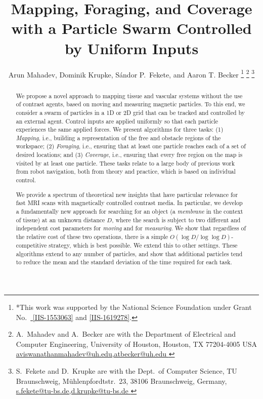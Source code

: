 \documentclass[letterpaper, 10 pt, conference]{ieeeconf}
\title{\LARGE \bf Mapping, Foraging, and Coverage\\ with a Particle Swarm Controlled by Uniform Inputs}
\author{Arun Mahadev, Dominik Krupke, S\'{a}ndor P.~Fekete, and Aaron T. Becker%
\thanks{*This work was supported by the National Science Foundation under Grant No.\ \href{http://nsf.gov/awardsearch/showAward?AWD_ID=1553063}{ [IIS-1553063]} and \href{http://nsf.gov/awardsearch/showAward?AWD_ID=1619278}{[IIS-1619278]}.}%
\thanks{A.~Mahadev and A.~Becker are with the Department of Electrical and Computer Engineering,  University of Houston, Houston, TX 77204-4005 USA 
      \protect\url{ aviswanathanmahadev@uh.edu,atbecker@uh.edu }}
\thanks{S.~Fekete and D.~Krupke are with the Dept.~of Computer Science, TU Braunschweig,  M\"uhlenpfordtstr.~23, 38106 Braunschweig, Germany,
      \protect\url{s.fekete@tu-bs.de,d.krupke@tu-bs.de  }
} %
}
\begin{document}
\maketitle
\thispagestyle{empty}
\pagestyle{empty}


\begin{abstract}
We propose a novel approach to mapping tissue and vascular systems without the use of contrast agents,
based on moving and measuring magnetic particles.
To this end, we consider a swarm of particles in a 1D or 2D grid that can be tracked and controlled by an external agent. 
Control inputs are applied uniformly so that each particle experiences the same applied forces. 
We present algorithms for three tasks: (1) {\em Mapping}, i.e., building a representation of the free and obstacle regions of the workspace;
(2) {\em Foraging}, i.e., ensuring that at least one particle reaches each of a set of desired locations; 
and (3) {\em Coverage}, i.e., ensuring that every free region on the map is visited by at least one particle.
These tasks relate to a large body of previous work from robot navigation, both from theory and practice, 
which is based on individual control.

We provide a spectrum of theoretical new insights 
that have particular relevance for fast MRI scans with magnetically controlled contrast media.
In particular, we develop a fundamentally new approach 
for searching for an object (a {\em membrane} in the context of tissue) at an unknown distance $D$, where the search is 
subject to two different and independent cost parameters
for {\em moving} and for {\em measuring}. We show that regardless of the relative cost of these two operations,
there is a simple $O(\log D/\log\log D)$-competitive strategy, which is best possible.
We extend this to other settings. 
These algorithms extend to any number of particles, and show that additional
particles tend to reduce the mean and the standard deviation of the time required for each task.  %


\end{abstract}
\end{document}
